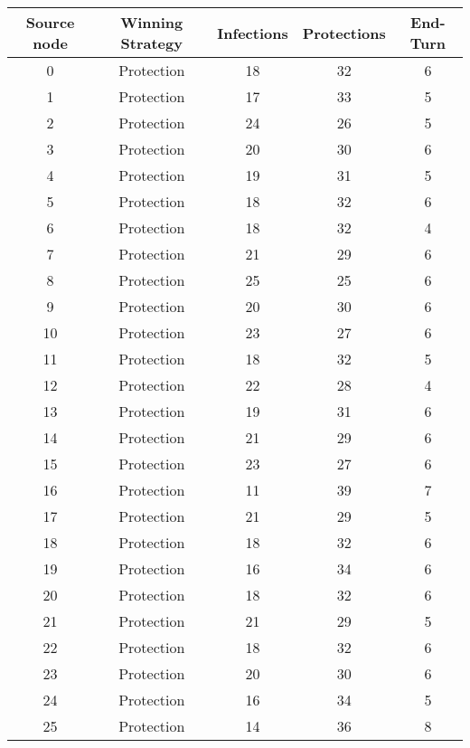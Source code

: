 \documentclass[results.tex]{subfiles}
\begin{document}
\begin{center}
  \begin{tabular}{| c || c | c | c | c |}
    \hline
    {\bfseries Source node} & {\bfseries Winning Strategy} & {\bfseries Infections} & {\bfseries Protections} & {\bfseries End-Turn} \\  %
    \hline\hline
    0 & Protection & 18 & 32 & 6 \\ 
    \hline
    1 & Protection & 17 & 33 & 5 \\ 
    \hline
    2 & Protection & 24 & 26 & 5 \\ 
    \hline
    3 & Protection & 20 & 30 & 6 \\ 
    \hline
    4 & Protection & 19 & 31 & 5 \\ 
    \hline
    5 & Protection & 18 & 32 & 6 \\ 
    \hline
    6 & Protection & 18 & 32 & 4 \\ 
    \hline
    7 & Protection & 21 & 29 & 6 \\ 
    \hline
    8 & Protection & 25 & 25 & 6 \\ 
    \hline
    9 & Protection & 20 & 30 & 6 \\ 
    \hline
    10 & Protection & 23 & 27 & 6 \\ 
    \hline
    11 & Protection & 18 & 32 & 5 \\ 
    \hline
    12 & Protection & 22 & 28 & 4 \\ 
    \hline
    13 & Protection & 19 & 31 & 6 \\ 
    \hline
    14 & Protection & 21 & 29 & 6 \\ 
    \hline
    15 & Protection & 23 & 27 & 6 \\ 
    \hline
    16 & Protection & 11 & 39 & 7 \\ 
    \hline
    17 & Protection & 21 & 29 & 5 \\ 
    \hline
    18 & Protection & 18 & 32 & 6 \\ 
    \hline
    19 & Protection & 16 & 34 & 6 \\ 
    \hline
    20 & Protection & 18 & 32 & 6 \\ 
    \hline
    21 & Protection & 21 & 29 & 5 \\ 
    \hline
    22 & Protection & 18 & 32 & 6 \\ 
    \hline
    23 & Protection & 20 & 30 & 6 \\ 
    \hline
    24 & Protection & 16 & 34 & 5 \\ 
    \hline
    25 & Protection & 14 & 36 & 8 \\ 

\end{tabular}
\end{center}
\end{document}
